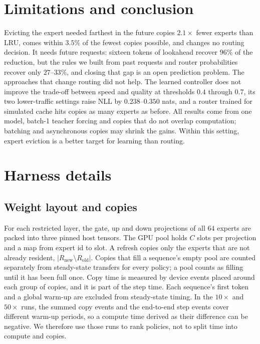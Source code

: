 \documentclass{article}
\begin{document}
\vspace{-4pt}
\section{Limitations and conclusion}
\label{sec:limitations}
\vspace{-2pt}

Evicting the expert needed farthest in the future copies $2.1\times$ fewer
experts than LRU, comes within $3.5\%$ of the fewest copies possible, and
changes no routing decision. It needs future requests: sixteen tokens of
lookahead recover $96\%$ of the reduction, but the rules we built from past
requests and router probabilities recover only $27$--$33\%$, and closing that
gap is an open prediction problem. The approaches that change routing did not
help. The learned controller does not improve the trade-off between speed and
quality at thresholds $0.4$ through $0.7$, its two lower-traffic settings raise
NLL by $0.238$--$0.350$ nats, and a router trained for simulated cache hits
copies as many experts as before. All results come from one model, batch-1
teacher forcing and copies that do not overlap computation; batching and
asynchronous copies may shrink the gains. Within this setting, expert eviction
is a better target for learning than routing.






\appendix

\section{Harness details}
\label{app:harness}

\subsection{Weight layout and copies}
For each restricted layer, the gate, up and
down projections of all $64$ experts are packed into three pinned host
tensors. The GPU pool holds $C$ slots per projection and a map from expert id
to slot. A refresh copies only the experts that are not already resident,
$|R_{\text{new}} \setminus R_{\text{old}}|$. Copies that fill a sequence's
empty pool are counted separately from steady-state transfers for every
policy; a pool counts as filling until it has been full once. Copy time is
measured by device events placed around each group of copies, and it is part
of the step time. Each sequence's first token and a global warm-up are
excluded from steady-state timing. In the $10\times$ and $50\times$ runs, the
summed copy events and the end-to-end step events cover different warm-up
periods, so a compute time derived as their difference can be negative. We
therefore use those runs to rank policies, not to split time into compute and
copies.
\end{document}
